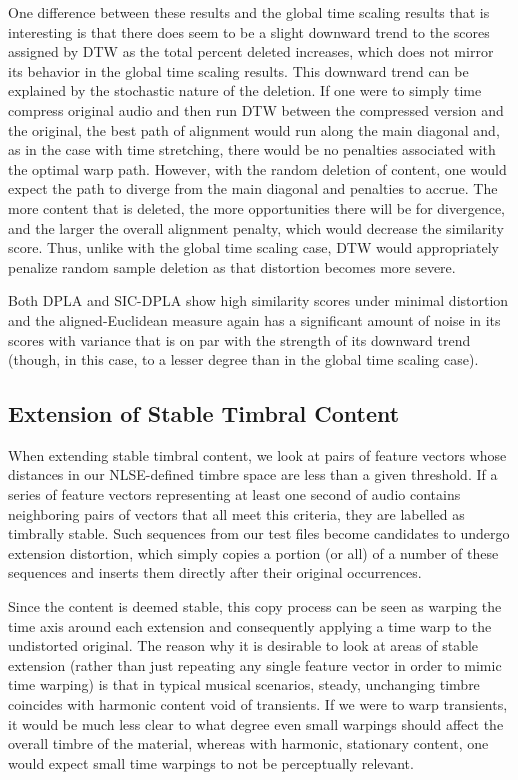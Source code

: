 \documentclass[12pt]{report} 	%
\numberwithin{figure}{chapter}
\numberwithin{table}{chapter}
\numberwithin{equation}{chapter}
\begin{document}
\begin{flushleft}
One difference between these results and the global time scaling results that is interesting is that there does seem to be a slight downward trend to the scores assigned by DTW as the total percent deleted increases, which does not mirror its behavior in the global time scaling results. This downward trend can be explained by the stochastic nature of the deletion. If one were to simply time compress original audio and then run DTW between the compressed version and the original, the best path of alignment would run along the main diagonal and, as in the case with time stretching, there would be no penalties associated with the optimal warp path. However, with the random deletion of content, one would expect the path to diverge from the main diagonal and penalties to accrue. The more content that is deleted, the more opportunities there will be for divergence, and the larger the overall alignment penalty, which would decrease the similarity score. Thus, unlike with the global time scaling case, DTW would appropriately penalize random sample deletion as that distortion becomes more severe.

Both DPLA and SIC-DPLA show high similarity scores under minimal distortion and the aligned-Euclidean measure again has a significant amount of noise in its scores with variance that is on par with the strength of its downward trend (though, in this case, to a lesser degree than in the global time scaling case).

\vspace{12pt}
\subsection{Extension of Stable Timbral Content}
When extending stable timbral content, we look at pairs of feature vectors whose distances in our NLSE-defined timbre space are less than a given threshold. If a series of feature vectors representing at least one second of audio contains neighboring pairs of vectors that all meet this criteria, they are labelled as timbrally stable. Such sequences from our test files become candidates to undergo extension distortion, which simply copies a portion (or all) of a number of these sequences and inserts them directly after their original occurrences.

Since the content is deemed stable, this copy process can be seen as warping the time axis around each extension and consequently applying a time warp to the undistorted original. The reason why it is desirable to look at areas of stable extension (rather than just repeating any single feature vector in order to mimic time warping) is that in typical musical scenarios, steady, unchanging timbre coincides with harmonic content void of transients. If we were to warp transients, it would be much less clear to what degree even small warpings should affect the overall timbre of the material, whereas with harmonic, stationary content, one would expect small time warpings to not be perceptually relevant.


\end{flushleft}
\end{document}
